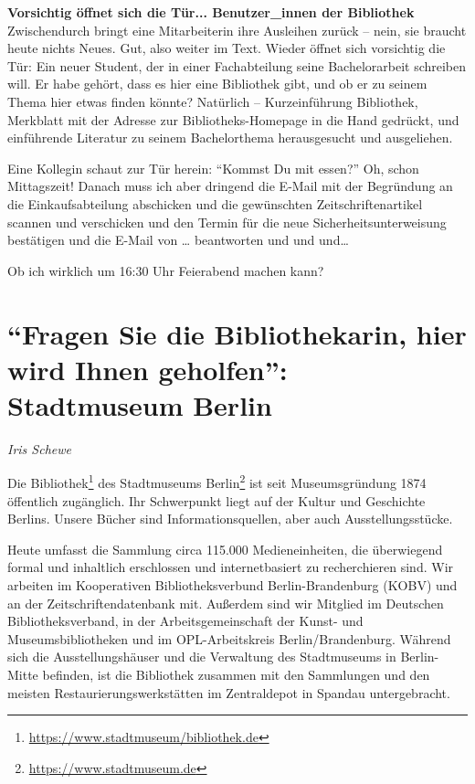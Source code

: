 \documentclass[a4paper,
fontsize=11pt,
oneside,
numbers=noperiodatend,
parskip=half-,
bibliography=totoc,
final
]{scrartcl}
\begin{document}
\textbf{Vorsichtig öffnet sich die Tür... Benutzer\_innen der
Bibliothek} Zwischendurch bringt eine Mitarbeiterin ihre Ausleihen
zurück -- nein, sie braucht heute nichts Neues. Gut, also weiter im
Text. Wieder öffnet sich vorsichtig die Tür: Ein neuer Student, der in
einer Fachabteilung seine Bachelorarbeit schreiben will. Er habe gehört,
dass es hier eine Bibliothek gibt, und ob er zu seinem Thema hier etwas
finden könnte? Natürlich -- Kurzeinführung Bibliothek, Merkblatt mit der
Adresse zur Bibliotheks-Homepage in die Hand gedrückt, und einführende
Literatur zu seinem Bachelorthema herausgesucht und ausgeliehen.

Eine Kollegin schaut zur Tür herein: \enquote{Kommst Du mit essen?} Oh,
schon Mittagszeit! Danach muss ich aber dringend die E-Mail mit der
Begründung an die Einkaufsabteilung abschicken und die gewünschten
Zeitschriftenartikel scannen und verschicken und den Termin für die neue
Sicherheitsunterweisung bestätigen und die E-Mail von \ldots{}
beantworten und und und\ldots{}

Ob ich wirklich um 16:30 Uhr Feierabend machen kann?

\hypertarget{fragen-sie-die-bibliothekarin-hier-wird-ihnen-geholfen-stadtmuseum-berlin}{%
\section*{\texorpdfstring{\enquote{Fragen Sie die Bibliothekarin,
hier wird Ihnen geholfen}: Stadtmuseum
Berlin}{``Fragen Sie die Bibliothekarin, hier wird Ihnen geholfen'': Stadtmuseum Berlin}}\label{fragen-sie-die-bibliothekarin-hier-wird-ihnen-geholfen-stadtmuseum-berlin}}

\emph{Iris Schewe}

Die Bibliothek\footnote{\url{https://www.stadtmuseum/bibliothek.de}} des
Stadtmuseums Berlin\footnote{\url{https://www.stadtmuseum.de}} ist seit
Museumsgründung 1874 öffentlich zugänglich. Ihr Schwerpunkt liegt auf
der Kultur und Geschichte Berlins. Unsere Bücher sind
Informationsquellen, aber auch Ausstellungsstücke.

Heute umfasst die Sammlung circa 115.000 Medieneinheiten, die
überwiegend formal und inhaltlich erschlossen und internetbasiert zu
recherchieren sind. Wir arbeiten im Kooperativen Bibliotheksverbund
Berlin-Brandenburg (KOBV) und an der Zeitschriftendatenbank mit.
Außerdem sind wir Mitglied im Deutschen Bibliotheksverband, in der
Arbeitsgemeinschaft der Kunst- und Museumsbibliotheken und im
OPL-Arbeitskreis Berlin/Brandenburg. Während sich die Ausstellungshäuser
und die Verwaltung des Stadtmuseums in Berlin-Mitte befinden, ist die
Bibliothek zusammen mit den Sammlungen und den meisten
Restaurierungswerkstätten im Zentraldepot in Spandau untergebracht.
\end{document}

